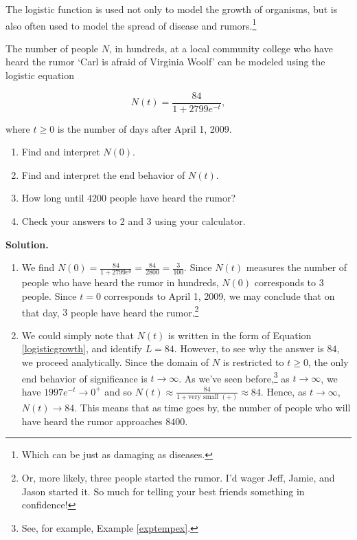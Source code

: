 The logistic function is used not only to model the growth of organisms, but is also often used to model the spread of disease and rumors.\footnote{Which can be just as damaging as diseases.}

\begin{ex} The number of people $N$, in hundreds, at a local community college who have heard the rumor `Carl is afraid of Virginia Woolf' can be modeled using the logistic equation

\[N(t) = \dfrac{84}{1+2799e^{-t}},\]

where $t\geq 0$ is the number of days after April 1, 2009.


\begin{enumerate}

\item  Find and interpret $N(0)$.

\item  Find and interpret the end behavior of $N(t)$. 

\item  How long until $4200$ people have heard the rumor?

\item  Check your answers to 2 and 3 using your calculator.

\end{enumerate}

{\bf Solution.}  

\begin{enumerate}

\item  We find $N(0) = \frac{84}{1+2799e^{0}} = \frac{84}{2800} = \frac{3}{100}$.  Since $N(t)$ measures the number of people who have heard the rumor in hundreds, $N(0)$ corresponds to $3$ people.  Since $t=0$ corresponds to April 1, 2009, we may conclude that on that day, $3$ people have heard the rumor.\footnote{Or, more likely, three people started the rumor.  I'd wager Jeff, Jamie, and Jason started it.  So much for telling your best friends something in confidence!} 

\item  We could simply note that $N(t)$ is written in the form of Equation \ref{logisticgrowth}, and identify $L = 84$.  However, to see why the answer is $84$, we proceed analytically.  Since the domain of $N$ is restricted to $t \geq 0$, the only end behavior of significance is $t \rightarrow \infty$. As we've seen before,\footnote{See, for example, Example \ref{exptempex}.} as $t \rightarrow \infty$, we have $1997 e^{-t} \rightarrow 0^{+}$ and so $N(t) \approx \frac{84}{1 + \mbox{very small $(+)$}} \approx 84$.  Hence, as $t \rightarrow \infty$, $N(t) \rightarrow 84$.   This means that as time goes by, the number of people who will have heard the rumor approaches $8400$. 


\end{enumerate}
\end{ex}
